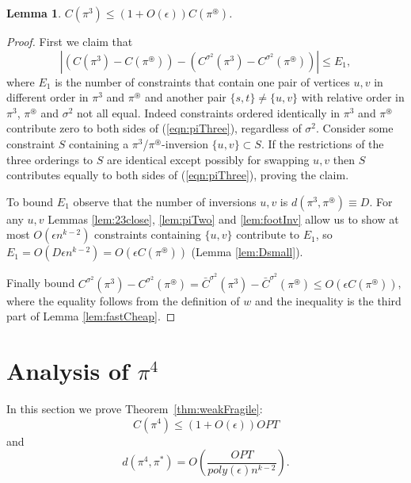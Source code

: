 \documentclass[dvips,11pt,letter]{article}
\newcommand{\set}[1]{\{#1\}}                        \newcommand{\setof}[2]{\{\,{#1}\::\:{#2}\,\}}        \newcommand{\groupFrac}[2]{\left(\frac{#1}{#2}\right)}
\newtheorem{lemma}[theorem]{Lemma}
\begin{document}
\begin{lemma}\label{lem:piThree}
$C(\pi^3) \le (1+O(\epsilon)) C(\pi^\circledast)$.
\end{lemma}
\begin{proof}
First we claim that
\begin{equation}
|(C(\pi^3) - C(\pi^\circledast)) - (C^{\sigma^2}(\pi^3) - C^{\sigma^2}(\pi^\circledast))| \le E_1 \label{eqn:piThree}
,\end{equation}
where $E_1$ is the number of constraints that contain one pair of vertices $u,v$ in different order in $\pi^3$ and $\pi^\circledast$ and another pair $\set{s,t} \ne \set{u,v}$ with relative order in $\pi^3$, $\pi^\circledast$ and $\sigma^2$ not all equal. Indeed constraints ordered identically in $\pi^3$ and $\pi^\circledast$ contribute zero to both sides of (\ref{eqn:piThree}), regardless of $\sigma^2$. Consider some constraint $S$ containing a  $\pi^3$/$\pi^\circledast$-inversion $\set{u,v} \subset S$. If the restrictions of the three orderings to $S$ are identical except possibly for swapping $u,v$ then $S$ contributes equally to both sides of (\ref{eqn:piThree}), proving the claim.

To bound $E_1$ observe that the number of inversions $u,v$ is $d(\pi^3,\pi^\circledast)\equiv D$. For any $u,v$ Lemmas \ref{lem:23close}, \ref{lem:piTwo} and \ref{lem:footInv} allow us to show at most $O(\epsilon n^{k-2})$ constraints containing $\set{u,v}$ contribute to $E_1$, so $E_1 = O(D \epsilon n^{k-2}) = O(\epsilon C(\pi^\circledast))$ (Lemma \ref{lem:Dsmall}).

Finally bound $C^{\sigma^2}(\pi^3) - C^{\sigma^2}(\pi^\circledast) = \bar C^{\sigma^2}(\pi^3) - \bar C^{\sigma^2}(\pi^\circledast) \le O(\epsilon C(\pi^\circledast))$, where the equality follows from the definition of $w$ and the inequality is the third part of Lemma \ref{lem:fastCheap}.
\end{proof}


\section{Analysis of $\pi^4$}  \label{sec:analysis}
In this section we prove Theorem~\ref{thm:weakFragile}:
\begin{equation}
C(\pi^4) \le (1+O(\epsilon)) OPT \label{eqn:pi4}
\end{equation}
and
\begin{equation}
d(\pi^4, \pi^*) = O\left(\frac{OPT}{poly(\epsilon) n^{k-2}}\right)\label{eqn:pi4close}
.\end{equation}
\end{document}

